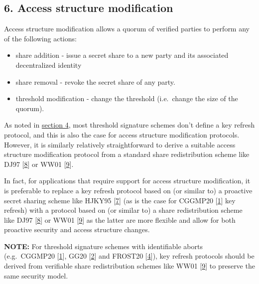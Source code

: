 \documentclass[
]{article}
\providecommand{\tightlist}{%
  \setlength{\itemsep}{0pt}\setlength{\parskip}{0pt}}
\begin{document}
\hypertarget{access-structure-modification}{%
\subsection{6. Access structure
modification}\label{access-structure-modification}}

Access structure modification allows a quorum of verified parties to
perform any of the following actions:

\begin{itemize}
\tightlist
\item
  share addition - issue a secret share to a new party and its
  associated decentralized identity
\item
  share removal - revoke the secret share of any party.
\item
  threshold modification - change the threshold (i.e.~change the size of
  the quorum).
\end{itemize}

As noted in \protect\hyperlink{augmentations}{section 4}, most threshold
signature schemes don't define a key refresh protocol, and this is also
the case for access structure modification protocols. However, it is
similarly relatively straightforward to derive a suitable access
structure modification protocol from a standard share redistribution
scheme like DJ97 {[}\protect\hyperlink{ref-dj97}{8}{]} or WW01
{[}\protect\hyperlink{ref-ww01}{9}{]}.

In fact, for applications that require support for access structure
modification, it is preferable to replace a key refresh protocol based
on (or similar to) a proactive secret sharing scheme like HJKY95
{[}\protect\hyperlink{ref-hjky95}{7}{]} (as is the case for CGGMP20
{[}\protect\hyperlink{ref-cggmp20}{1}{]} key refresh) with a protocol
based on (or similar to) a share redistribution scheme like DJ97
{[}\protect\hyperlink{ref-dj97}{8}{]} or WW01
{[}\protect\hyperlink{ref-ww01}{9}{]} as the latter are more flexible
and allow for both proactive security and access structure changes.

\textbf{NOTE:} For threshold signature schemes with identifiable aborts
(e.g.~CGGMP20 {[}\protect\hyperlink{ref-cggmp20}{1}{]}, GG20
{[}\protect\hyperlink{ref-gg20}{2}{]} and FROST20
{[}\protect\hyperlink{ref-frost20}{4}{]}), key refresh protocols should
be derived from verifiable share redistribution schemes like WW01
{[}\protect\hyperlink{ref-ww01}{9}{]} to preserve the same security
model.
\end{document}
